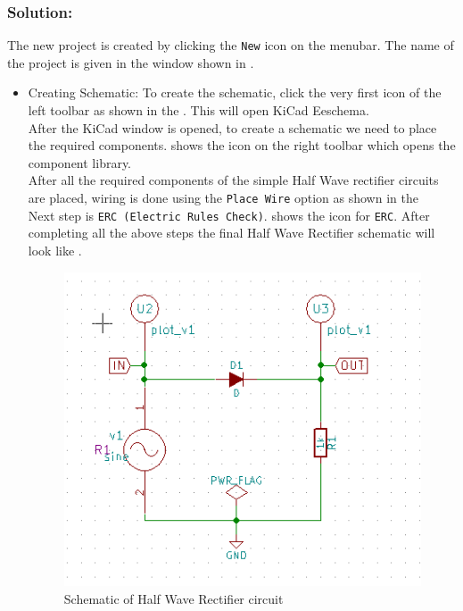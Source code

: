 \subsubsection{Solution:}
The new project is created by clicking the {\tt New} icon on the menubar. The name of the project is given in the window shown in .

\begin{itemize}
\item Creating Schematic:
To create the schematic, click the very first icon of the left toolbar as shown in the . This will open KiCad Eeschema.\\

After the KiCad window is opened, to create a schematic we need to place the required components.  shows the icon on the 
right toolbar which opens the component library.\\

After all the required components of the simple Half Wave rectifier circuits are placed, wiring is done using the {\tt Place Wire} option as shown in the \\

Next step is {\tt ERC (Electric Rules Check)}.  shows the icon for {\tt ERC}. After completing all the above steps the final Half Wave Rectifier schematic will look like .\\

\begin{figure}[!htp]
    \centering
    \includegraphics[width=\lgfig]{figures/hwr_schematic.png}
    \caption{Schematic of Half Wave Rectifier circuit}
    \label{hwr_schematic}
\end{figure}


\end{itemize}
